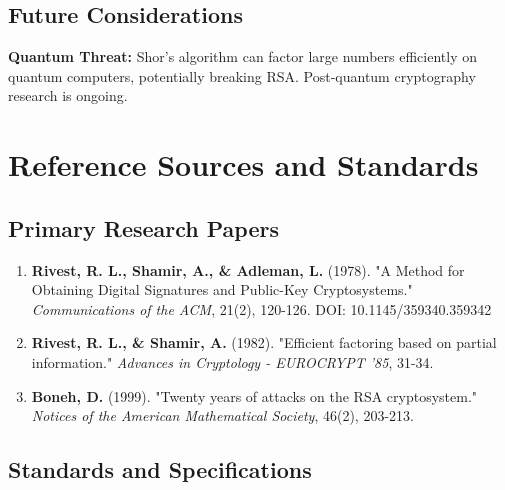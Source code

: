 \documentclass[11pt,a4paper]{article}
\begin{document}
\subsection{Future Considerations}

\begin{warningbox}
\textbf{Quantum Threat:} Shor's algorithm can factor large numbers efficiently on quantum computers, potentially breaking RSA. Post-quantum cryptography research is ongoing.
\end{warningbox}

\section{Reference Sources and Standards}

\subsection{Primary Research Papers}

\begin{enumerate}
    \item \textbf{Rivest, R. L., Shamir, A., \& Adleman, L.} (1978). "A Method for Obtaining Digital Signatures and Public-Key Cryptosystems." \textit{Communications of the ACM}, 21(2), 120-126. DOI: 10.1145/359340.359342
    
    \item \textbf{Rivest, R. L., \& Shamir, A.} (1982). "Efficient factoring based on partial information." \textit{Advances in Cryptology - EUROCRYPT '85}, 31-34.
    
    \item \textbf{Boneh, D.} (1999). "Twenty years of attacks on the RSA cryptosystem." \textit{Notices of the American Mathematical Society}, 46(2), 203-213.
\end{enumerate}

\subsection{Standards and Specifications}
\end{document}
